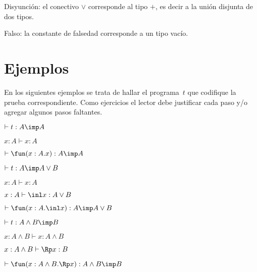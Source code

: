 \documentclass[11pt,letterpaper]{article}
\begin{document}
\item Disyunción: el conectivo $\lor$ corresponde al tipo $+$, es decir a la
  unión disjunta de dos tipos.
\begin{mathpar}


\end{mathpar}

\item Falso: la constante de falsedad corresponde a un tipo vacío.
\begin{mathpar}
\end{mathpar}
\ei

\section{Ejemplos}

En los siguientes ejemplos se trata de hallar el programa~$t$ que
codifique la prueba correspondiente. Como ejercicios el lector debe
justificar cada paso y/o agregar algunos pasos faltantes.

\bi
\item $\vdash t: A\imp A$
  \be
  \item $x:A \vdash x:A$
    \item $\vdash \fun(x:A.x): A\imp A$
  \ee

\item $\vdash t: A\imp A\lor B$
  \be
  \item $x:A\vdash x:A$
    \item $x:A\vdash\inl x:A\lor B$
      \item $\vdash \fun(x:A.\inl x):A\imp A\lor B$
  \ee
  

\item $\vdash t: A\land B\imp B$
  \be
  \item $x:A\land B\vdash x:A\land B$
    \item $x:A\land B\vdash \Rp x:B$
      \item $\vdash\fun(x:A\land B.\Rp x):A\land B\imp B$
  \ee
\end{document}

